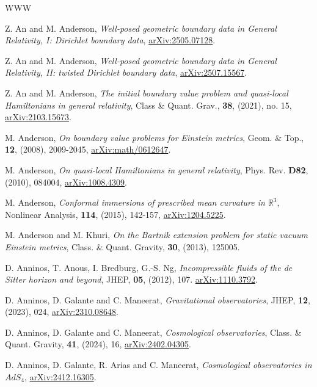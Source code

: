 \documentclass[10pt]{amsart}
\newcommand{\bR}{\mathbb R}
\newcommand{\<}{\langle}
\renewcommand{\>}{\rangle}
\theoremstyle{plain}
\theoremstyle{remark}
\theoremstyle{definition}
\numberwithin{equation}{section}
\begin{document}
\begin{thebibliography}{WWW}

\footnotesize 

 Z. An and M. Anderson, {\it Well-posed geometric boundary data in General Relativity, I: Dirichlet boundary data}, 
\href{https://arXiv.org/abs/2505.07128}{arXiv:2505.07128}. 

 Z. An and M. Anderson, {\it Well-posed geometric boundary data in General Relativity, II: twisted Dirichlet boundary data}, 
\href{https://arXiv.org/abs/2507.15567}{arXiv:2507.15567}. 

 Z. An and M. Anderson, {\it The initial boundary value problem and quasi-local Hamiltonians in general relativity}, 
Class \& Quant. Grav., {\bf 38},  (2021), no. 15, \href{https://arXiv.org/abs/2103.15673}{arXiv:2103.15673}. 

 M. Anderson, {\it On boundary value problems for Einstein metrics}, Geom. \& Top., {\bf 12}, (2008), 2009-2045, 
\href{https://arXiv.org/abs/math/0612647}{arXiv:math/0612647}. 

 M. Anderson, {\it On quasi-local Hamiltonians in general relativity}, Phys. Rev. {\bf D82}, (2010), 084004, 
\href{https://arXiv.org/abs/1008.4309}{arXiv:1008.4309}. 

 M. Anderson, {\it Conformal immersions of prescribed mean curvature in $\bR^3$},
Nonlinear Analysis, {\bf 114}, (2015), 142-157,  \href{https://arXiv.org/abs/1204.5225}{arXiv:1204.5225}. 

 M. Anderson and M. Khuri, {\it On the Bartnik extension problem for static vacuum Einstein metrics}, 
Class. \& Quant. Gravity, {\bf 30}, (2013), 125005. 

 D. Anninos, T. Anous, I. Bredburg, G.-S. Ng, {\it Incompressible fluids of the de Sitter horizon and beyond}, 
JHEP, {\bf 05}, (2012), 107. \href{https://arXiv.org/abs/1110.3792}{arXiv:1110.3792}. 

 D. Anninos, D. Galante and C. Maneerat, {\it Gravitational observatories}, 
JHEP, {\bf 12}, (2023), 024, \href{https://arXiv.org/abs/2310.08648}{arXiv:2310.08648}. 

 D. Anninos, D. Galante and C. Maneerat, {\it Cosmological observatories}, 
Class. \& Quant. Gravity, {\bf 41}, (2024), 16, \href{https://arXiv.org/abs/2402.04305}{arXiv:2402.04305}. 

 D. Anninos, D. Galante, R. Arias and C. Maneerat, {\it Cosmological observatories in $AdS_4$}, 
\href{https://arXiv.org/abs/2412.16305}{arXiv:2412.16305}. 


\end{thebibliography}
\end{document}
